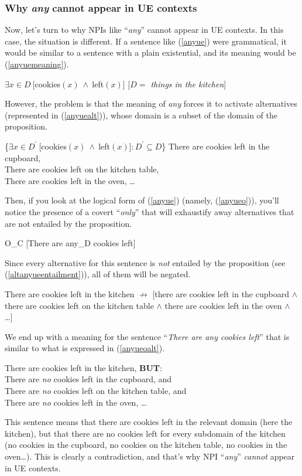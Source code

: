 \documentclass[a4paper,11pt]{article}
\newcommand{\reff}[1]{(\ref{#1})}
\newcommand{\exs}[2][]{\begin{exe}\ex #1 \begin{xlist}#2\end{xlist}\end{exe}}
\begin{document}
\subsubsection{Why \emph{any} cannot appear in UE contexts}\label{subsec:anyue}
Now, let's turn to why NPIs like \enquote{\emph{any}} cannot appear in UE contexts. In this case, the situation is different. If a sentence like \reff{anyue} were grammatical, it would be similar to a sentence with a plain existential, and its meaning would be \reff{anyuemeaning}.

\exs{
	\label{anyue}
	\ex\label{anyuemeaning} $\exists{x \in D}~[$cookies$(x)~\wedge~$left$(x)]$ \hfill [\emph{$D =$ things in the kitchen}]
}
%
However, the problem is that the meaning of \emph{any} forces it to activate alternatives (represented in \reff{anyuealt}), whose domain is a subset of the domain of the proposition.

\exs[\label{anyuealt}]{	
	\ex \{$\exists{x \in D^{\prime}}~[$cookies$(x)~\wedge~$left$(x)]: D^{\prime} \subseteq D$\}
	\ex\label{anyuealtexamples} There are cookies left in the cupboard,\\
		There are cookies left on the kitchen table,\\
		There are cookies left in the oven, \ldots{}
}
%
Then, if you look at the logical form of \reff{anyue} (namely, \reff{anyueo}), you'll notice the presence of a covert \enquote{\emph{only}} that will exhaustify away alternatives that are not entailed by the proposition. 

\begin{exe}
  \ex\label{anyueo} O_C [There are any_D cookies left]
\end{exe}
%
Since every alternative for this sentence is \emph{not} entailed by the proposition (see \reff{altanyueentailment}), all of them will be negated.

\begin{exe}
	\ex\label{altanyueentailment} There are cookies left in the kitchen $\nrightarrow$ [there are cookies left in the cupboard $\wedge$ there are cookies left on the kitchen table $\wedge$ there are cookies left in the oven $\wedge$ \ldots{}]
\end{exe}
%
We end up with a meaning for the sentence \enquote{\emph{There are any cookies left}} that is similar to what is expressed in \reff{anyueoalt}.

\begin{exe}
	\ex\label{anyueoalt} There are cookies left in the kitchen, \textbf{BUT}:\\
						 There are \emph{no} cookies left in the cupboard, and\\
						 There are \emph{no} cookies left on the kitchen table, and\\
						 There are \emph{no} cookies left in the oven, \ldots{}
\end{exe}
%
This sentence means that there are cookies left in the relevant domain (here the kitchen), but that there are no cookies left for every subdomain of the kitchen (no cookies in the cupboard, no cookies on the kitchen table, no cookies in the oven\ldots{}). This is clearly a contradiction, and that's why NPI \enquote{\emph{any}} \emph{cannot} appear in UE contexts.
\end{document}
